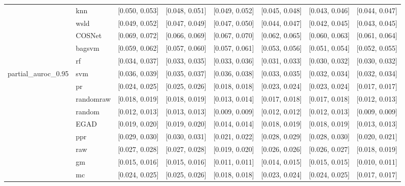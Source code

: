 \begin{table}[H]
{\begin{tabular}{llllllll}
 & knn & [0.050, 0.053] & [0.048, 0.051] & [0.049, 0.052] & [0.045, 0.048] & [0.043, 0.046] & [0.044, 0.047]\\

 & wsld & [0.049, 0.052] & [0.047, 0.049] & [0.047, 0.050] & [0.044, 0.047] & [0.042, 0.045] & [0.043, 0.045]\\

 & COSNet & [0.069, 0.072] & [0.066, 0.069] & [0.067, 0.070] & [0.062, 0.065] & [0.060, 0.063] & [0.061, 0.064]\\

 & bagsvm & [0.059, 0.062] & [0.057, 0.060] & [0.057, 0.061] & [0.053, 0.056] & [0.051, 0.054] & [0.052, 0.055]\\

 & rf & [0.034, 0.037] & [0.033, 0.035] & [0.033, 0.036] & [0.031, 0.033] & [0.030, 0.032] & [0.030, 0.032]\\

\multirow{-15}{*}{\raggedright\arraybackslash partial\_auroc\_0.95} & svm & [0.036, 0.039] & [0.035, 0.037] & [0.036, 0.038] & [0.033, 0.035] & [0.032, 0.034] & [0.032, 0.034]\\
\cmidrule{1-8}
 & pr & [0.024, 0.025] & [0.025, 0.026] & [0.018, 0.018] & [0.023, 0.024] & [0.023, 0.024] & [0.017, 0.017]\\

 & randomraw & [0.018, 0.019] & [0.018, 0.019] & [0.013, 0.014] & [0.017, 0.018] & [0.017, 0.018] & [0.012, 0.013]\\

 & random & [0.012, 0.013] & [0.013, 0.013] & [0.009, 0.009] & [0.012, 0.012] & [0.012, 0.013] & [0.009, 0.009]\\

 & EGAD & [0.019, 0.020] & [0.019, 0.020] & [0.014, 0.014] & [0.018, 0.019] & [0.018, 0.019] & [0.013, 0.013]\\

 & ppr & [0.029, 0.030] & [0.030, 0.031] & [0.021, 0.022] & [0.028, 0.029] & [0.028, 0.030] & [0.020, 0.021]\\

 & raw & [0.027, 0.028] & [0.027, 0.028] & [0.019, 0.020] & [0.026, 0.026] & [0.026, 0.027] & [0.018, 0.019]\\

 & gm & [0.015, 0.016] & [0.015, 0.016] & [0.011, 0.011] & [0.014, 0.015] & [0.015, 0.015] & [0.010, 0.011]\\

 & mc & [0.024, 0.025] & [0.025, 0.026] & [0.018, 0.018] & [0.023, 0.024] & [0.024, 0.025] & [0.017, 0.017]\\


\end{tabular}}
\end{table}
